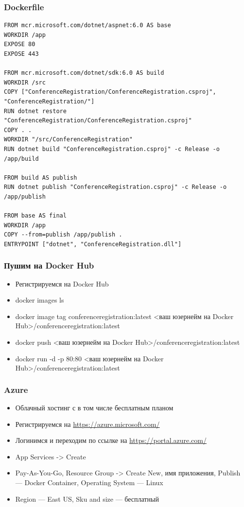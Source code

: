 \documentclass{../../slides-style}
\begin{document}
    \begin{frame}[fragile]
        \frametitle{Dockerfile}
        \begin{scriptsize}
            \begin{verbatim}
FROM mcr.microsoft.com/dotnet/aspnet:6.0 AS base
WORKDIR /app
EXPOSE 80
EXPOSE 443

FROM mcr.microsoft.com/dotnet/sdk:6.0 AS build
WORKDIR /src
COPY ["ConferenceRegistration/ConferenceRegistration.csproj", "ConferenceRegistration/"]
RUN dotnet restore "ConferenceRegistration/ConferenceRegistration.csproj"
COPY . .
WORKDIR "/src/ConferenceRegistration"
RUN dotnet build "ConferenceRegistration.csproj" -c Release -o /app/build

FROM build AS publish
RUN dotnet publish "ConferenceRegistration.csproj" -c Release -o /app/publish

FROM base AS final
WORKDIR /app
COPY --from=publish /app/publish .
ENTRYPOINT ["dotnet", "ConferenceRegistration.dll"]
            \end{verbatim}
        \end{scriptsize}
    \end{frame}

    \begin{frame}[fragile]
        \frametitle{Пушим на Docker Hub}
        \begin{itemize}
            \item Регистрируемся на Docker Hub
            \item docker images ls
            \item docker image tag conferenceregistration:latest <ваш юзернейм на Docker Hub>/conferenceregistration:latest
            \item docker push <ваш юзернейм на Docker Hub>/conferenceregistration:latest
            \item docker run -d -p 80:80 <ваш юзернейм на Docker Hub>/conferenceregistration:latest
        \end{itemize}
    \end{frame}

    \begin{frame}
        \frametitle{Azure}
        \begin{itemize}
            \item Облачный хостинг с в том числе бесплатным планом
            \item Регистрируемся на \url{https://azure.microsoft.com/}
            \item Логинимся и переходим по ссылке на \url{https://portal.azure.com/}
            \item App Services -> Create
            \item Pay-As-You-Go, Resource Group -> Create New, имя приложения, Publish --- Docker Container, Operating System --- Linux
            \item Region --- East US, Sku and size --- бесплатный
        \end{itemize}
    \end{frame}
\end{document}
